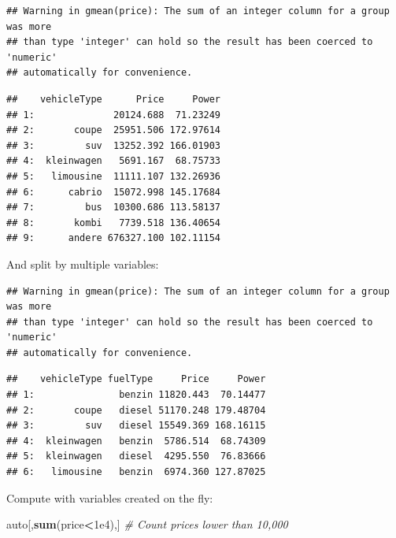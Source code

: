\documentclass[]{book}
\newenvironment{Shaded}{\begin{snugshade}}{\end{snugshade}}
\newcommand{\KeywordTok}[1]{\textcolor[rgb]{0.13,0.29,0.53}{\textbf{#1}}}
\newcommand{\DataTypeTok}[1]{\textcolor[rgb]{0.13,0.29,0.53}{#1}}
\newcommand{\FloatTok}[1]{\textcolor[rgb]{0.00,0.00,0.81}{#1}}
\newcommand{\StringTok}[1]{\textcolor[rgb]{0.31,0.60,0.02}{#1}}
\newcommand{\CommentTok}[1]{\textcolor[rgb]{0.56,0.35,0.01}{\textit{#1}}}
\newcommand{\OperatorTok}[1]{\textcolor[rgb]{0.81,0.36,0.00}{\textbf{#1}}}
\newcommand{\NormalTok}[1]{#1}
\theoremstyle{definition}
\theoremstyle{definition}
\theoremstyle{definition}
\theoremstyle{remark}
\begin{document}
\begin{verbatim}
## Warning in gmean(price): The sum of an integer column for a group was more
## than type 'integer' can hold so the result has been coerced to 'numeric'
## automatically for convenience.
\end{verbatim}

\begin{verbatim}
##    vehicleType      Price     Power
## 1:              20124.688  71.23249
## 2:       coupe  25951.506 172.97614
## 3:         suv  13252.392 166.01903
## 4:  kleinwagen   5691.167  68.75733
## 5:   limousine  11111.107 132.26936
## 6:      cabrio  15072.998 145.17684
## 7:         bus  10300.686 113.58137
## 8:       kombi   7739.518 136.40654
## 9:      andere 676327.100 102.11154
\end{verbatim}

And split by multiple variables:

\begin{Shaded}
\end{Shaded}

\begin{verbatim}
## Warning in gmean(price): The sum of an integer column for a group was more
## than type 'integer' can hold so the result has been coerced to 'numeric'
## automatically for convenience.
\end{verbatim}

\begin{verbatim}
##    vehicleType fuelType     Price     Power
## 1:               benzin 11820.443  70.14477
## 2:       coupe   diesel 51170.248 179.48704
## 3:         suv   diesel 15549.369 168.16115
## 4:  kleinwagen   benzin  5786.514  68.74309
## 5:  kleinwagen   diesel  4295.550  76.83666
## 6:   limousine   benzin  6974.360 127.87025
\end{verbatim}

Compute with variables created on the fly:

\begin{Shaded}
\begin{Highlighting}[]
\NormalTok{auto[,}\KeywordTok{sum}\NormalTok{(price}\OperatorTok{<}\FloatTok{1e4}\NormalTok{),] }\CommentTok{# Count prices lower than 10,000}
\end{Highlighting}
\end{Shaded}
\end{document}
